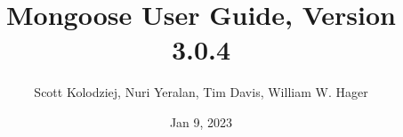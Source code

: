 \title{Mongoose User Guide, Version 3.0.4}
\author{Scott Kolodziej, Nuri Yeralan, Tim Davis, William W. Hager}
\date{Jan 9, 2023}
